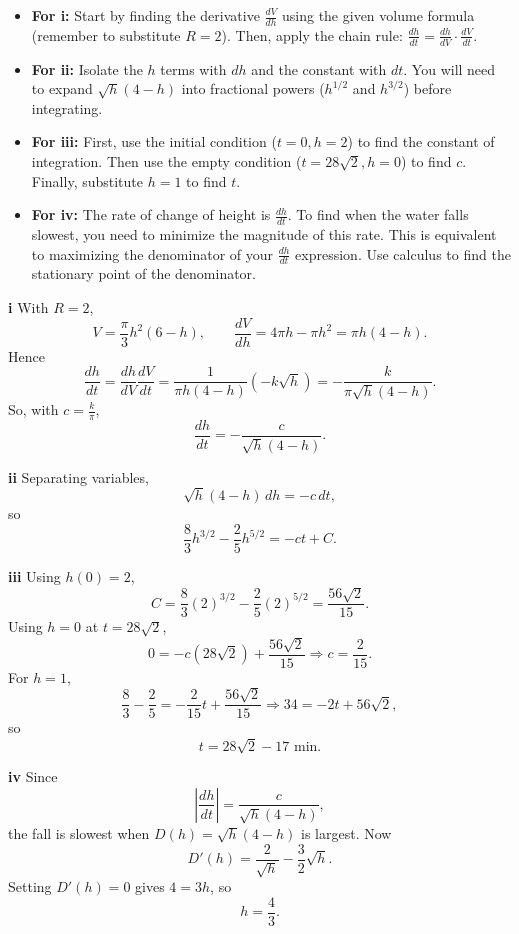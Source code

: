 \begin{hint}
\begin{itemize}
    \item \textbf{For i:} Start by finding the derivative $\frac{dV}{dh}$ using the given volume formula (remember to substitute $R=2$). Then, apply the chain rule: $\frac{dh}{dt} = \frac{dh}{dV} \cdot \frac{dV}{dt}$.
    \item \textbf{For ii:} Isolate the $h$ terms with $dh$ and the constant with $dt$. You will need to expand $\sqrt{h}(4-h)$ into fractional powers ($h^{1/2}$ and $h^{3/2}$) before integrating.
    \item \textbf{For iii:} First, use the initial condition ($t=0, h=2$) to find the constant of integration. Then use the empty condition ($t=28\sqrt{2}, h=0$) to find $c$. Finally, substitute $h=1$ to find $t$.
    \item \textbf{For iv:} The rate of change of height is $\frac{dh}{dt}$. To find when the water falls slowest, you need to minimize the magnitude of this rate. This is equivalent to maximizing the denominator of your $\frac{dh}{dt}$ expression. Use calculus to find the stationary point of the denominator.
\end{itemize}
\end{hint}

\begin{solution}
\textbf{i} With $R=2$,
\[
V=\frac{\pi}{3}h^2(6-h),\qquad \frac{dV}{dh}=4\pi h-\pi h^2=\pi h(4-h).
\]
Hence
\[
\frac{dh}{dt}=\frac{dh}{dV}\frac{dV}{dt}
=\frac{1}{\pi h(4-h)}(-k\sqrt h)
=-\frac{k}{\pi\sqrt h(4-h)}.
\]
So, with $c=\frac{k}{\pi}$,
\[
\boxed{\frac{dh}{dt}=-\frac{c}{\sqrt h(4-h)}}.
\]

\textbf{ii} Separating variables,
\[
\sqrt h(4-h)\,dh=-c\,dt,
\]
so
\[
\boxed{\frac83 h^{3/2}-\frac25 h^{5/2}=-ct+C}.
\]

\textbf{iii} Using $h(0)=2$,
\[
C=\frac83(2)^{3/2}-\frac25(2)^{5/2}=\frac{56\sqrt2}{15}.
\]
Using $h=0$ at $t=28\sqrt2$,
\[
0=-c(28\sqrt2)+\frac{56\sqrt2}{15}\Rightarrow \boxed{c=\frac{2}{15}}.
\]
For $h=1$,
\[
\frac83-\frac25=-\frac{2}{15}t+\frac{56\sqrt2}{15}
\Rightarrow 34=-2t+56\sqrt2,
\]
so
\[
\boxed{t=28\sqrt2-17\text{ min}}.
\]

\textbf{iv} Since
\[
\left|\frac{dh}{dt}\right|=\frac{c}{\sqrt h(4-h)},
\]
the fall is slowest when $D(h)=\sqrt h(4-h)$ is largest. Now
\[
D'(h)=\frac{2}{\sqrt h}-\frac{3}{2}\sqrt h.
\]
Setting $D'(h)=0$ gives $4=3h$, so
\[
\boxed{h=\frac43}.
\]
\end{solution}

